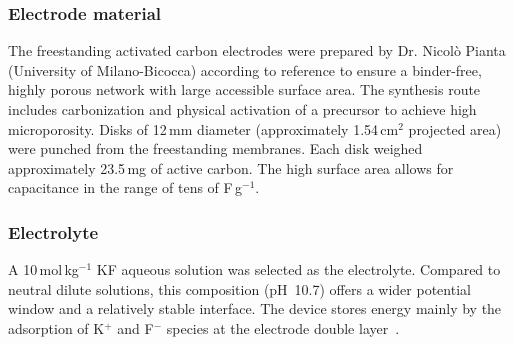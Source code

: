 \subsubsection{Electrode material}
The freestanding activated carbon electrodes were prepared by Dr. Nicolò Pianta (University of Milano-Bicocca) according to reference \cite{tribbiaSuperCap2020} to ensure a binder-free, highly porous network with large accessible surface area. The synthesis route includes carbonization and physical activation of a precursor to achieve high microporosity.
Disks of 12\,mm diameter (approximately 1.54\,cm$^2$ projected area) were punched from the freestanding membranes. Each disk weighed approximately 23.5\,mg of active carbon. The high surface area allows for capacitance in the range of tens of F\,g$^{-1}$.

\subsubsection{Electrolyte}
A 10\,mol\,kg$^{-1}$ KF aqueous solution was selected as the electrolyte. Compared to neutral dilute solutions, this composition (pH~10.7) offers a wider potential window and a relatively stable interface. The device stores energy mainly by the adsorption of K$^+$ and F$^-$ species at the electrode double layer~\cite{piantaEvaluationKineticParameters2023a}.

